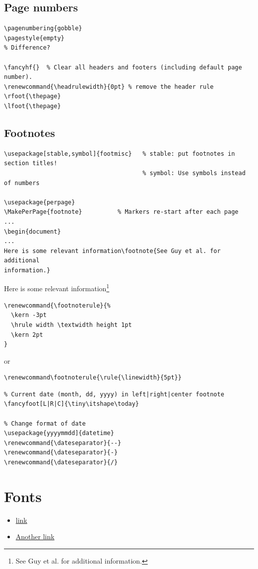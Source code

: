 \documentclass{article}
\begin{document}
\subsection{Page numbers}
\begin{lstlisting}
\pagenumbering{gobble}
\pagestyle{empty}
% Difference?

\fancyhf{}  % Clear all headers and footers (including default page number).
\renewcommand{\headrulewidth}{0pt} % remove the header rule
\rfoot{\thepage}
\lfoot{\thepage}
\end{lstlisting}

\subsection{Footnotes}
\begin{lstlisting}
\usepackage[stable,symbol]{footmisc}   % stable: put footnotes in section titles!
                                       % symbol: Use symbols instead of numbers

\usepackage{perpage}
\MakePerPage{footnote}          % Markers re-start after each page
...
\begin{document}
...
Here is some relevant information\footnote{See Guy et al. for additional
information.}
\end{lstlisting}
Here is some relevant information\footnote{See Guy et al. for additional
information.}

\begin{lstlisting}
\renewcommand{\footnoterule}{%
  \kern -3pt
  \hrule width \textwidth height 1pt
  \kern 2pt
}
\end{lstlisting}
or
\begin{lstlisting}
\renewcommand\footnoterule{\rule{\linewidth}{5pt}}
\end{lstlisting}

\begin{lstlisting}
% Current date (month, dd, yyyy) in left|right|center footnote
\fancyfoot[L|R|C]{\tiny\itshape\today}

% Change format of date
\usepackage{yyyymmdd]{datetime}
\renewcommand{\dateseparator}{--}
\renewcommand{\dateseparator}{-}
\renewcommand{\dateseparator}{/}
\end{lstlisting}

\newpage
\section{Fonts}
\begin{itemize}
    \item \href{https://www.tug.org/pracjourn/2006-1/schmidt/schmidt.pdf}{link}
    \item \href{https://en.wikibooks.org/wiki/LaTeX/Fonts}{Another link}
\end{itemize}
\end{document}
